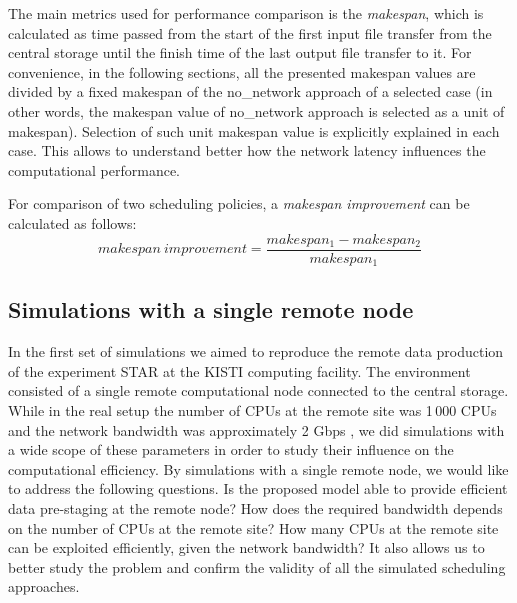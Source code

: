 \documentclass{svjour3}                     %
\begin{document}
The main metrics used for performance comparison is the \textit{makespan}, which is calculated as time passed from the start of the first input file transfer from the central storage until the finish time of the last output file transfer to it. For convenience, in the following sections, all the presented makespan values are divided by a fixed makespan of the no\_network approach of a selected case (in other words, the makespan value of no\_network approach is selected as a unit of makespan). Selection of such unit makespan value is explicitly explained in each case. This allows to understand better how the network latency influences the computational performance.

For comparison of two scheduling policies, a \textit{makespan improvement} can be calculated as follows:
\begin{equation}
\label{makespanImprovement}
 makespan~improvement = \frac{makespan_{1} - makespan_{2}}{makespan_{1}} 
\end{equation}


\subsection{Simulations with a single remote node}
\label{1nodeSim}
In the first set of simulations we aimed to reproduce the remote data production of the experiment STAR at the KISTI computing facility. The environment consisted of a single remote computational node connected to the central storage. While in the real setup the number of CPUs at the remote site was 1\,000 CPUs and the network bandwidth was approximately 2 Gbps \cite{KISTI-production}, we did simulations with a wide scope of these parameters in order to study their influence on the computational efficiency. By simulations with a single remote node, we would like to address the following questions. Is the proposed model able to provide efficient data pre-staging at the remote node? How does the required bandwidth depends on the number of CPUs at the remote site? How many CPUs at the remote site can be exploited efficiently, given the network bandwidth? It also allows us to better study the problem and confirm the validity of all the simulated scheduling approaches.

\end{document}
